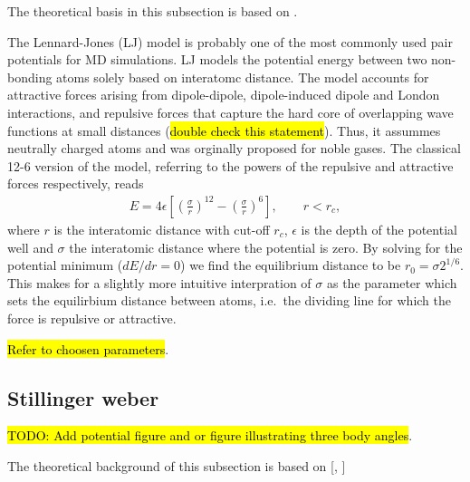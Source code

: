 The theoretical basis in this subsection is based on \cite{docs_lammps_LJ,
C9CP05445F, chem_libretexts_LJ}.

The Lennard-Jones (\acrshort{LJ}) model is probably one of the most commonly
used pair potentials for \acrshort{MD} simulations. \acrshort{LJ} models the
potential energy between two non-bonding atoms solely based on interatomc
distance. The model accounts for attractive forces arising from dipole-dipole,
dipole-induced dipole and London interactions, and repulsive forces that capture
the hard core of overlapping wave functions at small distances (\hl{double check
this statement}). Thus, it assummes neutrally charged atoms and was orginally
proposed for noble gases. The classical 12-6 version of the model, referring to
the powers of the repulsive and attractive forces respectively, reads
\begin{align}
  E = 4\epsilon \left[\left(\frac{\sigma}{r}\right)^{12} - \left(\frac{\sigma}{r}\right)^6 \right ], \qquad r < r_c,
  \label{eq:LJ}
\end{align}
where $r$ is the interatomic distance with cut-off $r_c$, $\epsilon$ is the
depth of the potential well and $\sigma$ the interatomic distance where the
potential is zero. By solving for the potential minimum ($dE/dr = 0$) we find
the equilibrium distance to be $r_0 = \sigma 2^{1/6}$. This makes for a slightly
more intuitive interpration of $\sigma$ as the parameter which sets the
equilirbium distance between atoms, i.e.\ the dividing line for which the force
is repulsive or attractive.

\hl{Refer to choosen parameters}.



\subsection{Stillinger weber}
\hl{TODO: Add potential figure and or figure illustrating three body angles}.

The theoretical background of this subsection is based on
[\cite{docs_lammps_sw}, \cite{PhysRevB.31.5262}]

